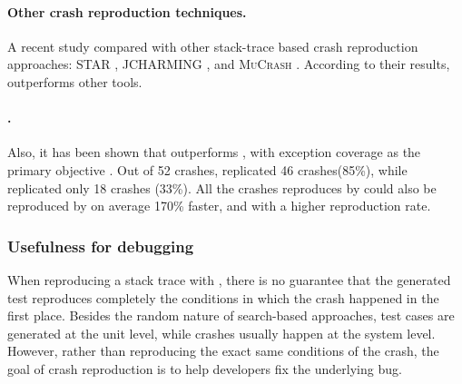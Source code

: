 \paragraph{Other crash reproduction techniques.}
%
A recent study \etal \cite{soltani2017, Soltani2018a} compared \evocrash with other stack-trace based crash reproduction approaches: \textsc{STAR} \cite{Chen2015}, \textsc{JCHARMING} \cite{Nayrolles2017}, and \textsc{MuCrash} \cite{Xuan2015}.
According to their results, \evocrash outperforms other tools.

\paragraph{\evosuite{}.}
%
Also, it has been shown that \evocrash outperforms \evosuite, with exception coverage as the primary objective \cite{Soltani2018a}. 
Out of 52 crashes, \evocrash replicated 46 crashes(85\%), while \evosuite replicated only 18 crashes (33\%). 
All the crashes reproduces by \evosuite could also be reproduced by \evocrash on average 170\% faster, and with a higher reproduction rate. 

\subsubsection{Usefulness for debugging}

When reproducing a stack trace with \evocrash, there is no guarantee that the generated test reproduces completely the conditions in which the crash happened in the first place. Besides the random nature of search-based approaches, test cases are generated at the unit level, while crashes usually happen at the system level. However, rather than reproducing the exact same conditions of the crash, the goal of crash reproduction is to help developers fix the underlying bug.

